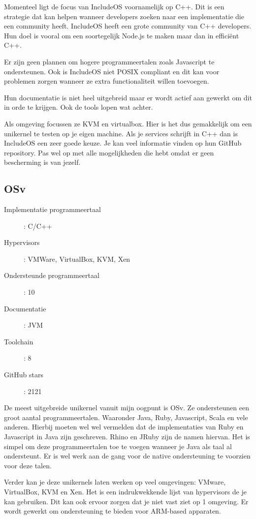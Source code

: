 \documentclass[pdftex,a4paper,12pt,twoside]{report}
\begin{document}
Momenteel ligt de focus van IncludeOS voornamelijk op C++. Dit is een strategie dat kan helpen wanneer developers zoeken naar een implementatie die een community heeft. IncludeOS heeft een grote community van C++ developers. Hun doel is vooral om een soortegelijk Node.js te maken maar dan in efficiënt C++.

Er zijn geen plannen om hogere programmeertalen zoals Javascript te ondersteunen. Ook is IncludeOS niet POSIX compliant en dit kan voor problemen zorgen wanneer ze extra functionaliteit willen toevoegen.

Hun documentatie is niet heel uitgebreid maar er wordt actief aan gewerkt om dit in orde te krijgen. Ook de tools lopen wat achter.

Als omgeving focussen ze KVM en virtualbox. Hier is het dus gemakkelijk om een unikernel te testen op je eigen machine. Als je services schrijft in C++ dan is IncludeOS een zeer goede keuze. Je kan veel informatie vinden op hun GitHub repository. Pas wel op met alle mogelijkheden die hebt omdat er geen bescherming is van jezelf.

\subsection{OSv}

\begin{description}
  \item [Implementatie programmeertaal]: C/C++
  \item [Hypervisors]: VMWare, VirtualBox, KVM, Xen
  \item [Ondersteunde programmeertaal]: 10
  \item [Documentatie]: JVM
  \item [Toolchain]: 8
  \item [GitHub stars]: 2121
\end{description}

De meest uitgebreide unikernel vanuit mijn oogpunt is OSv. Ze ondersteunen een groot aantal programmeertalen. Waaronder Java, Ruby, Javascript, Scala en vele anderen. Hierbij moeten wel wel vermelden dat de implementaties van Ruby en Javascript in Java zijn geschreven. Rhino en JRuby zijn de namen hiervan. Het is simpel om deze programmeertalen toe te voegen wanneer je Java als taal al ondersteunt. Er is wel werk aan de gang voor de native ondersteuning te voorzien voor deze talen.

Verder kan je deze unikernels laten werken op veel omgevingen: VMware, VirtualBox, KVM en Xen. Het is een indrukwekkende lijst van hypervisors de je kan gebruiken. Dit kan ook ervoor zorgen dat je niet vast ziet op 1 omgeving. Er wordt gewerkt om ondersteuning te bieden voor ARM-based apparaten.
\end{document}
